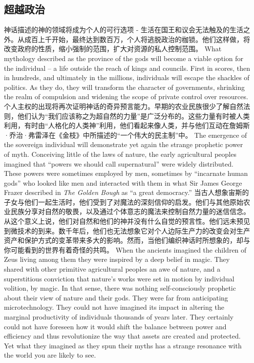 \subsection{超越政治}
\begin{paracol}{2}[]
神话描述的神的领域将成为个人的可行选项 - 生活在国王和议会无法触及的生活之外。从成百上千开始，最终达到数百万，个人将逃脱政治的枷锁。他们这样做，将改变政府的性质，缩小强制的范围，扩大对资源的私人控制范围。
\switchcolumn
What mythology described as the province of the gods will become a viable option for the individual -- a life outside the reach of kings and councils. First in scores, then in hundreds, and ultimately in the millions, individuals will escape the shackles of politics. As they do, they will transform the character of governments, shrinking the realm of compulsion and widening the scope of private control over resources.
\switchcolumn*
个人主权的出现将再次证明神话的奇异预言能力。早期的农业民族很少了解自然法则，他们认为“我们应该称之为超自然的力量”是广泛分布的。这些力量有时被人类利用，有时由“人格化的人类神”利用，他们看起来像人类，并与他们互动在詹姆斯·乔治·弗雷泽在《金枝》中所描述的“一个伟大的民主制”中。
\switchcolumn
The emergence of the sovereign individual will demonstrate yet again the strange prophetic power of myth. Conceiving little of the laws of nature, the early agricultural peoples imagined that ``powers we should call supernatural'' were widely distributed. These powers were sometimes employed by men, sometimes by ``incarnate human gods'' who looked like men and interacted with them in what Sir James George Frazer described in \emph{The Golden Bough} as ``a great democracy.''
\switchcolumn*
当古人想象宙斯的子女与他们一起生活时，他们受到了对魔法的深刻信仰的启发。他们与其他原始农业民族分享对自然的敬畏，以及通过个体意志的魔法来控制自然力量的迷信信念。从这个意义上说，他们对自然和他们的神并没有什么自觉的预言性。他们远未预见到微技术的到来。数千年后，他们也无法想象它对个人边际生产力的改变会对生产资产和保护方式的变革带来多大的影响。然而，当他们编织神话时所想象的，却与你可能看到的世界有着奇怪的共鸣。
\switchcolumn
When the ancients imagined the children of Zeus living among them they were inspired by a deep belief in magic. They shared with other primitive agricultural peoples an awe of nature, and a superstitious conviction that nature's works were set in motion by individual volition, by magic. In that sense, there was nothing self-consciously prophetic about their view of nature and their gods. They were far from anticipating microtechnology. They could not have imagined its impact in altering the marginal productivity of individuals thousands of years later. They certainly could not have foreseen how it would shift the balance between power and efficiency and thus revolutionize the way that assets are created and protected. Yet what they imagined as they spun their myths has a strange resonance with the world you are likely to see.
\end{paracol}

